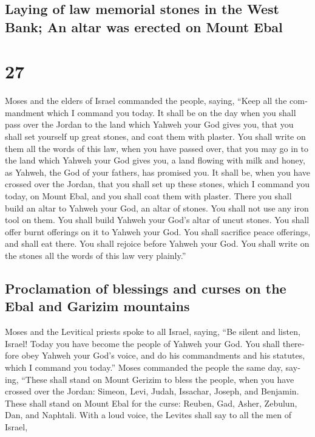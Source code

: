 \begin{paracol}{2}
\switchcolumn
\begin{otherlanguage}{english}

\hypertarget{laying-of-law-memorial-stones-in-the-west-bank-an-altar-was-erected-on-mount-ebal}{%
\subsection{Laying of law memorial stones in the West Bank; An altar was
erected on Mount
Ebal}\label{laying-of-law-memorial-stones-in-the-west-bank-an-altar-was-erected-on-mount-ebal}}

\hypertarget{section-53}{%
\section{27}\label{section-53}}

 Moses and the elders of Israel commanded the people,
saying, ``Keep all the commandment which I command you today.
 It shall be on the day when you shall pass over the
Jordan to the land which Yahweh your God gives you, that you shall set
yourself up great stones, and coat them with plaster.  You
shall write on them all the words of this law, when you have passed
over, that you may go in to the land which Yahweh your God gives you, a
land flowing with milk and honey, as Yahweh, the God of your fathers,
has promised you.  It shall be, when you have crossed over
the Jordan, that you shall set up these stones, which I command you
today, on Mount Ebal, and you shall coat them with plaster.
 There you shall build an altar to Yahweh your God, an
altar of stones. You shall not use any iron tool on them. 
You shall build Yahweh your God's altar of uncut stones. You shall offer
burnt offerings on it to Yahweh your God.  You shall
sacrifice peace offerings, and shall eat there. You shall rejoice before
Yahweh your God.  You shall write on the stones all the
words of this law very plainly.''

\hypertarget{proclamation-of-blessings-and-curses-on-the-ebal-and-garizim-mountains}{%
\subsection{Proclamation of blessings and curses on the Ebal and Garizim
mountains}\label{proclamation-of-blessings-and-curses-on-the-ebal-and-garizim-mountains}}

 Moses and the Levitical priests spoke to all Israel,
saying, ``Be silent and listen, Israel! Today you have become the people
of Yahweh your God.  You shall therefore obey Yahweh your
God's voice, and do his commandments and his statutes, which I command
you today.''  Moses commanded the people the same day,
saying,  ``These shall stand on Mount Gerizim to bless
the people, when you have crossed over the Jordan: Simeon, Levi, Judah,
Issachar, Joseph, and Benjamin.  These shall stand on
Mount Ebal for the curse: Reuben, Gad, Asher, Zebulun, Dan, and
Naphtali.  With a loud voice, the Levites shall say to
all the men of Israel,


\end{otherlanguage}
\end{paracol}
